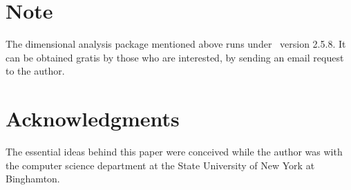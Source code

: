 \section*{Note} 
The dimensional analysis package mentioned above runs under \gpp\
version 2.5.8.  It can be obtained gratis by those who are
interested, by sending an email request to the author.

\section*{Acknowledgments}
The essential ideas behind this paper were conceived while the
author was with the computer science department at the State
University of New York at Binghamton.






